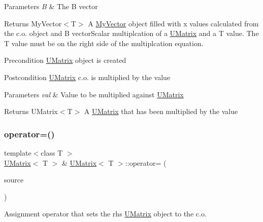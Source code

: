 \begin{DoxyParams}{Parameters}
{\em B} & The B vector \\
\hline
\end{DoxyParams}
\begin{DoxyReturn}{Returns}
My\+Vector$<$\+T$>$ A \mbox{\hyperlink{class_my_vector}{My\+Vector}} object filled with x values calculated from the c.\+o. object and B vector\+Scalar multiplcation of a \mbox{\hyperlink{class_u_matrix}{U\+Matrix}} and a T value. The T value must be on the right side of the multiplcation equation. 
\end{DoxyReturn}
\begin{DoxyPrecond}{Precondition}
\mbox{\hyperlink{class_u_matrix}{U\+Matrix}} object is created 
\end{DoxyPrecond}
\begin{DoxyPostcond}{Postcondition}
\mbox{\hyperlink{class_u_matrix}{U\+Matrix}} c.\+o. is multiplied by the value 
\end{DoxyPostcond}

\begin{DoxyParams}{Parameters}
{\em val} & Value to be multiplied against \mbox{\hyperlink{class_u_matrix}{U\+Matrix}} \\
\hline
\end{DoxyParams}
\begin{DoxyReturn}{Returns}
U\+Matrix$<$\+T$>$ A \mbox{\hyperlink{class_u_matrix}{U\+Matrix}} that has been multiplied by the value 
\end{DoxyReturn}
\mbox{\label{class_u_matrix_a3f12f4544a460dd93dac8a883654310f}} 
\subsubsection{\texorpdfstring{operator=()}{operator=()}}
{\footnotesize\ttfamily template$<$class T $>$ \\
\mbox{\hyperlink{class_u_matrix}{U\+Matrix}}$<$ T $>$ \& \mbox{\hyperlink{class_u_matrix}{U\+Matrix}}$<$ T $>$\+::operator= (\begin{DoxyParamCaption}\item[{const \mbox{\hyperlink{class_u_matrix}{U\+Matrix}}$<$ T $>$ \&}]{source }\end{DoxyParamCaption})}



Assignment operator that sets the rhs \mbox{\hyperlink{class_u_matrix}{U\+Matrix}} object to the c.\+o. 


